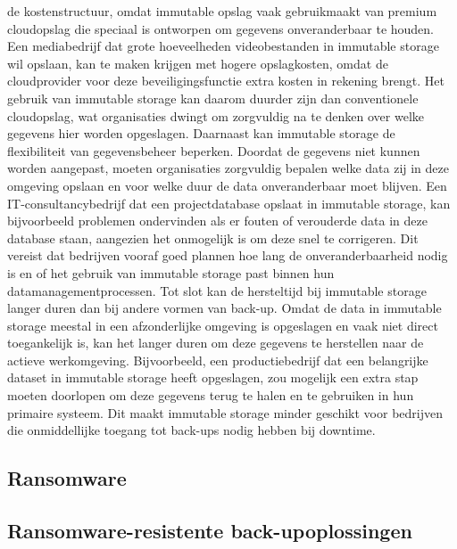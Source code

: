 de kostenstructuur, omdat immutable opslag vaak gebruikmaakt van premium cloudopslag die speciaal is ontworpen om gegevens onveranderbaar te houden. Een mediabedrijf dat grote hoeveelheden videobestanden in immutable storage wil opslaan, kan te maken krijgen met hogere opslagkosten, omdat de cloudprovider voor deze beveiligingsfunctie extra kosten in rekening brengt. Het gebruik van immutable storage kan daarom duurder zijn dan conventionele cloudopslag, wat organisaties dwingt om zorgvuldig na te denken over welke gegevens hier worden opgeslagen. Daarnaast kan immutable storage de flexibiliteit van gegevensbeheer beperken. Doordat de gegevens niet kunnen worden aangepast, moeten organisaties zorgvuldig bepalen welke data zij in deze omgeving opslaan en voor welke duur de data onveranderbaar moet blijven. Een IT-consultancybedrijf dat een projectdatabase opslaat in immutable storage, kan bijvoorbeeld problemen ondervinden als er fouten of verouderde data in deze database staan, aangezien het onmogelijk is om deze snel te corrigeren. Dit vereist dat bedrijven vooraf goed plannen hoe lang de onveranderbaarheid nodig is en of het gebruik van immutable storage past binnen hun datamanagementprocessen. Tot slot kan de hersteltijd bij immutable storage langer duren dan bij andere vormen van back-up. Omdat de data in immutable storage meestal in een afzonderlijke omgeving is opgeslagen en vaak niet direct toegankelijk is, kan het langer duren om deze gegevens te herstellen naar de actieve werkomgeving. Bijvoorbeeld, een productiebedrijf dat een belangrijke dataset in immutable storage heeft opgeslagen, zou mogelijk een extra stap moeten doorlopen om deze gegevens terug te halen en te gebruiken in hun primaire systeem. Dit maakt immutable storage minder geschikt voor bedrijven die onmiddellijke toegang tot back-ups nodig hebben bij downtime.
\subsection{Ransomware}
\subsection{Ransomware-resistente back-upoplossingen}
